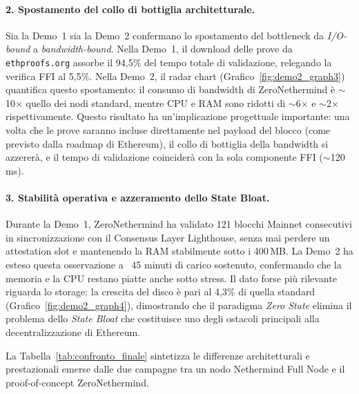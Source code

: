 \documentclass[12pt,a4paper,openright,twoside]{report}
\begin{document}
\paragraph{2. Spostamento del collo di bottiglia architetturale.}
Sia la Demo~1 sia la Demo~2 confermano lo spostamento del bottleneck da \textit{I/O-bound} a \textit{bandwidth-bound}. Nella Demo~1, il download delle prove da \texttt{ethproofs.org} assorbe il 94,5\% del tempo totale di validazione, relegando la verifica FFI al 5,5\%. Nella Demo~2, il radar chart (Grafico~\ref{fig:demo2_graph3}) quantifica questo spostamento: il consumo di bandwidth di ZeroNethermind è $\sim$10$\times$ quello dei nodi standard, mentre CPU e RAM sono ridotti di $\sim$6$\times$ e $\sim$2$\times$ rispettivamente. Questo risultato ha un'implicazione progettuale importante: una volta che le prove saranno incluse direttamente nel payload del blocco (come previsto dalla roadmap di Ethereum), il collo di bottiglia della bandwidth si azzererà, e il tempo di validazione coinciderà con la sola componente FFI ($\sim$120\,ms).

\paragraph{3. Stabilità operativa e azzeramento dello State Bloat.}
Durante la Demo~1, ZeroNethermind ha validato 121 blocchi Mainnet consecutivi in sincronizzazione con il Consensus Layer Lighthouse, senza mai perdere un attestation slot e mantenendo la RAM stabilmente sotto i 400\,MB. La Demo~2 ha esteso questa osservazione a ~45 minuti di carico sostenuto, confermando che la memoria e la CPU restano piatte anche sotto stress. Il dato forse più rilevante riguarda lo storage: la crescita del disco è pari al 4,3\% di quella standard (Grafico~\ref{fig:demo2_graph4}), dimostrando che il paradigma \textit{Zero State} elimina il problema dello \textit{State Bloat} che costituisce uno degli ostacoli principali alla decentralizzazione di Ethereum.

\medskip

La Tabella~\ref{tab:confronto_finale} sintetizza le differenze architetturali e prestazionali emerse dalle due campagne tra un nodo Nethermind Full Node e il proof-of-concept ZeroNethermind.
\end{document}
